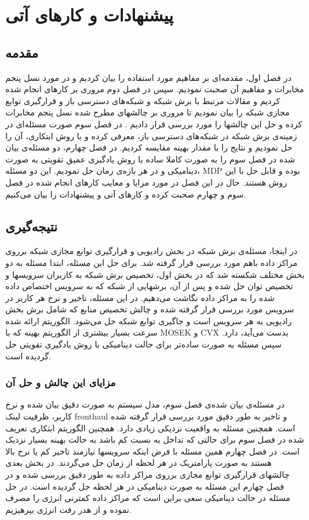 \chapter{پیشنهادات و کارهای آتی}
\section{مقدمه}
در فصل اول، مقدمه‌ای بر مفاهیم مورد استفاده را بیان کردیم و در مورد نسل پنجم مخابرات و مفاهیم آن صحبت نمودیم. سپس در فصل دوم مروری بر کارهای انجام شده کردیم و مقالات مرتبط با برش شبکه و شبکه‌های دسترسی باز و قرارگیری توابع مجازی شبکه را بیان نمودیم تا مروری بر چالشهای مطرح شده نسل پنجم مخابرات کرده و حل این چالشها را مورد بررسی قرار دادیم . در فصل سوم صورت مسئله‌ای در زمینه‌ی برش شبکه در شبکه‌های دسترسی باز، معرفی کرده و با روش ابتکاری، آن را حل نمودیم و نتایج را با مقدار بهینه مقایسه کردیم.
در  فصل چهارم، دو مسئله‌ی بیان شده در فصل سوم را به صورت کاملا ساده با روش یادگیری عمیق تقویتی به صورت دینامیکی و در هر بازه‌ی زمان حل نمودیم. این دو مسئله، MDP 
بوده و قابل حل با این روش هستند. 
حال در این فصل در مورد مزایا و معایب کارهای انجام شده در فصل سوم و چهارم صحبت کرده و کارهای آتی و پیشنهادات را بیان می‌کنیم.
\section{نتیجه‌گیری}
در اینجا، مسئله‌ی برش شبکه در بخش رادیویی و قرارگیری توابع مجازی شبکه برروی مراکز داده باهم مورد بررسی قرار گرفته شد.
برای حل این مسئله، ابتدا مسئله به دو بخش مختلف شکسته شد که در بخش اول، تخصیص برش شبکه به کاربران سرویسها و تخصیص توان حل شده و پس از آن، برشهایی از شبکه که به سرویس اختصاص داده شده را به مراکز داده نگاشت می‌دهیم.
در این مسئله، تاخیر و نرخ هر کاربر در سرویس مورد بررسی قرار گرفته شده و چالش تخصیص منابع که شامل برش بخش رادیویی به هر سرویس است و جاگیری توابع شبکه حل می‌شود.
 الگوریتم ارائه شده سرعت بسیار بیشتری از الگوریتم بهینه که با MOSEK و CVX بدست می‌آید، دارد.
 سپس مسئله به صورت ساده‌تر برای حالت دینامیکی با روش یادگیری تقویتی حل گردیده است. 
 \subsection{مزایای این چالش و حل آن}
 در مسئله‌ی بیان شده‌ی فصل سوم، مدل سیستم به صورت دقیق بیان شده و نرخ کاربر، ظرفیت لینک fronthaul و تاخیر به طور دقیق مورد بررسی قرار گرفته شده است. همچنین مسئله به واقعیت نزدیکی زیادی دارد. همچنین الگوریتم ابتکاری تعریف شده در فصل سوم برای حالتی که تداخل به نسبت کم باشد به حالت بهینه بسیار نزدیک است. در فصل چهارم همین مسئله با فرض اینکه سرویسها نیازمند تاخیر کم یا نرخ بالا هستند به صورت پارامتریک در هر لحظه از زمان حل می‌گردند. 
 در بخش بعدی چالشهای قرارگیری توابع مجازی برروی مراکز داده به طور دقیق بررسی شده و ‌در فصل چهارم این مسئله به صورت دینامیکی در هر لحظه حل گردیده است. در حل مسئله در حالت دینامیکی سعی براین است که مراکز داده کمترنی انرژی را مصرف نموده و از هدر رفت انرژی بپرهیزیم.
